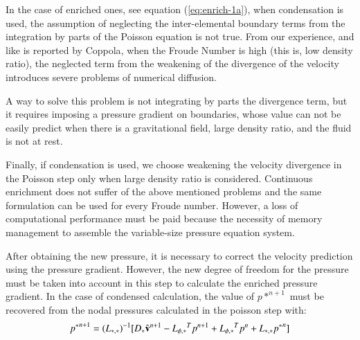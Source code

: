 
In the case of enriched ones, see equation (\ref{eq:enrich-1a}), when condensation is used, the assumption of neglecting the inter-elemental boundary terms from the integration by parts of the Poisson equation is not true. From our experience, and like is reported by Coppola\cite{Coppola05}, when the Froude Number is high (this is, low density ratio), the neglected term from the weakening of the divergence of the velocity introduces severe problems of numerical diffusion.

A way to solve this problem is not integrating by parts the divergence term, but it requires imposing a pressure gradient on boundaries, whose value can not be easily predict when there is a gravitational field, large density ratio, and the fluid is not at rest.

Finally, if condensation is used, we choose weakening the velocity divergence in the Poisson step only when large density ratio is considered. Continuous enrichment does not suffer of the above mentioned problems and the same formulation can be used for every
Froude number. However, a loss of computational performance must be paid because the necessity of memory management to assemble the variable-size pressure equation system.


%

After obtaining the new pressure, it is necessary to correct the velocity prediction using the pressure gradient. However, the new degree of freedom for the pressure must be taken into account in this step to calculate the enriched pressure gradient. In the case of condensed calculation, the value of $p*^{n+1}$ must be recovered from the nodal pressures calculated in the poisson step with:
\begin{equation}
  {p^*}^{n+1} = {(L_{*,*})}^{-1}[D_* \hat{\mathbf{v}}^{n+1} - {L_{\phi,*}}^Tp^{n+1} + {L_{\phi,*}}^Tp^{n} + L_{*,*}{p^*}^n]
  \label{recovering}
\end{equation}

